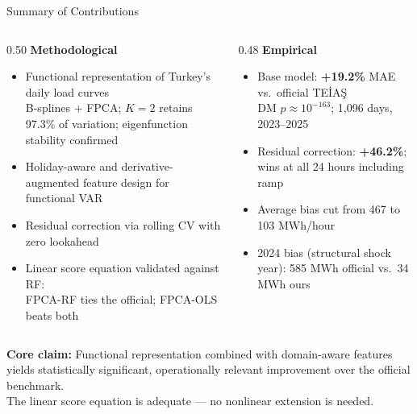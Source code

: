 \documentclass[10pt,aspectratio=169]{beamer}
\begin{document}
\begin{frame}{Summary of Contributions}
  \begin{columns}
    \begin{column}{0.50\textwidth}
      \textbf{Methodological}
      \vspace{0.3em}
      \begin{itemize}
        \item Functional representation of Turkey's daily load curves\\
              {\small B-splines + FPCA; $K=2$ retains 97.3\% of variation; eigenfunction stability confirmed}
        \item Holiday-aware and derivative-augmented feature design for functional VAR
        \item Residual correction via rolling CV with zero lookahead
        \item Linear score equation validated against RF:\\
              {\small FPCA-RF ties the official; FPCA-OLS beats both}
      \end{itemize}
    \end{column}
    \begin{column}{0.48\textwidth}
      \textbf{Empirical}
      \vspace{0.3em}
      \begin{itemize}
        \item Base model: \textbf{+19.2\%} MAE vs.\ official TEİAŞ\\
              {\small DM $p \approx 10^{-163}$; 1,096 days, 2023--2025}
        \item Residual correction: \textbf{+46.2\%}; wins at all 24 hours including ramp
        \item Average bias cut from 467 to 103 MWh/hour
        \item 2024 bias (structural shock year): 585 MWh official vs.\ 34 MWh ours
      \end{itemize}
    \end{column}
  \end{columns}
  \vspace{0.5em}
  \begin{center}
    \small
    \textbf{Core claim:} Functional representation combined with domain-aware features\\
    yields statistically significant, operationally relevant improvement over the official benchmark.\\
    The linear score equation is adequate --- no nonlinear extension is needed.
  \end{center}
\end{frame}
\end{document}
